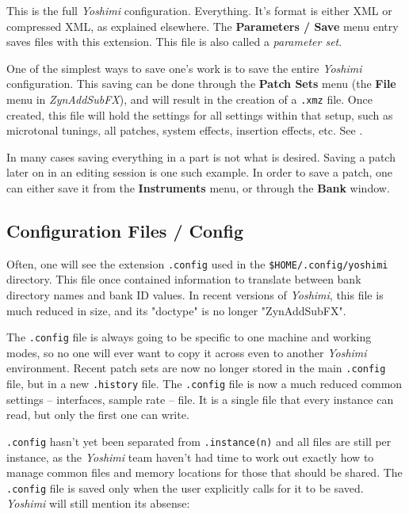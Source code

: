    This is the full \textsl{Yoshimi} configuration. Everything.  It's format is
   either XML or compressed XML, as explained elsewhere.  The \textbf{Parameters
   / Save} menu entry saves files with this extension.  This file is also called
   a \textsl{parameter set}.

   One of the simplest ways to save one's work is to save the entire
   \textsl{Yoshimi} configuration.
   This saving can be done through the \textbf{Patch Sets} menu
   (the \textbf{File} menu in \textsl{ZynAddSubFX}),
   and will result in the creation of
   a \texttt{.xmz} file. Once created, this file will hold the settings for
   all settings within that setup, such as microtonal tunings, all
   patches, system effects, insertion effects, etc.
   See .

   In many cases saving everything in a part is not what is desired.
   Saving a patch later on in an editing session is one such example.
   In order to save a patch, one can either save it from the
   \textbf{Instruments} menu, or through the \textbf{Bank} window.

\subsection{Configuration Files / Config}
\label{subsec:configuration_config}

   Often, one will see the extension \texttt{.config} used in the
   \texttt{\$HOME/.config/yoshimi} directory.  This file once contained
   information to translate between bank directory names and bank ID
   values.  In recent versions of \textsl{Yoshimi}, this file is much
   reduced in size, and its "doctype" is no longer "ZynAddSubFX".

   The \texttt{.config} file is always going to be specific to one machine and
   working modes, so no one will ever want to copy it across even to another
   \textsl{Yoshimi} environment.  Recent patch sets are now no longer stored in
   the main \texttt{.config} file, but in a new \texttt{.history} file.  The
   \texttt{.config} file is now a much reduced common settings -- interfaces,
   sample rate -- file.  It is a single file that every instance can read, but
   only the first one can write.
   
   \texttt{.config} hasn't yet been separated
   from \texttt{.instance(n)} and all files are still per instance, as the
   \textsl{Yoshimi} team haven't had time to work out exactly how to manage
   common files and memory locations for those that should be shared.  The
   \texttt{.config} file is saved only when the user explicitly calls for it to
   be saved.
   \textsl{Yoshimi} will still mention its absense:

